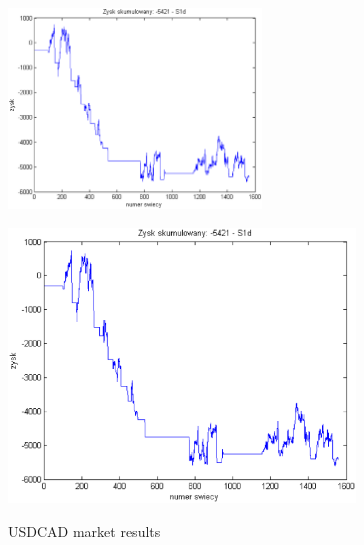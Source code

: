 \documentclass{tewiart}
\begin{document}
\begin{figure}[h]
\begin{minipage}{\linewidth}
\label{cztero}
\end{minipage}
\begin{minipage}{\linewidth}
\centering
\includegraphics[width=0.6\textwidth]{images/usdcadS1d.eps}
\label{mansard}
\end{minipage}
\begin{minipage}{.49\linewidth}
\centering
\includegraphics[width=0.82\textwidth]{images/usdcadS1s.eps}
\label{mansard}
\end{minipage}
\caption{USDCAD market results}
\end{figure}




\end{document}
